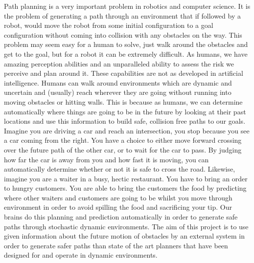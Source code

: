 \documentclass[letterpaper, 10pt, conference]{ieeeconf}
\begin{document}
Path planning is a very important problem in robotics and computer science. It
is the problem of generating a path through an environment that if followed by
a robot, would move the robot from some initial configuration to a goal
configuration without coming into collision with any obstacles on the way. This
problem may seem easy for a human to solve, just walk around the obstacles and
get to the goal, but for a robot it can be extremely difficult. As humans, we
have amazing perception abilities and an unparalleled ability to assess the
risk we perceive and plan around it. These capabilities are not as developed in
artificial intelligence. Humans can walk around environments which are dynamic
and uncertain and (usually) reach wherever they are going without running into
moving obstacles or hitting walls. This is because as humans, we can determine
automatically where things are going to be in the future by looking at their
past locations and use this information to build safe, collision free paths to
our goals. Imagine you are driving a car and reach an intersection, you stop
because you see a car coming from the right. You have a choice to either move
forward crossing over the future path of the other car, or to wait for the car
to pass. By judging how far the car is away from you and how fast it is moving,
you can automatically determine whether or not it is safe to cross the road.
Likewise, imagine you are a waiter in a busy, hectic restaurant. You have to
bring an order to hungry customers. You are able to bring the customers the
food by predicting where other waiters and customers are going to be whilst you
move through environment in order to avoid spilling the food and sacrificing
your tip. Our brains do this planning and prediction automatically in order to
generate safe paths through stochastic dynamic environments. The aim of this
project is to use given information about the future motion of obstacles by an
external system in order to generate safer paths than state of the art planners
that have been designed for and operate in dynamic environments.
\end{document}

